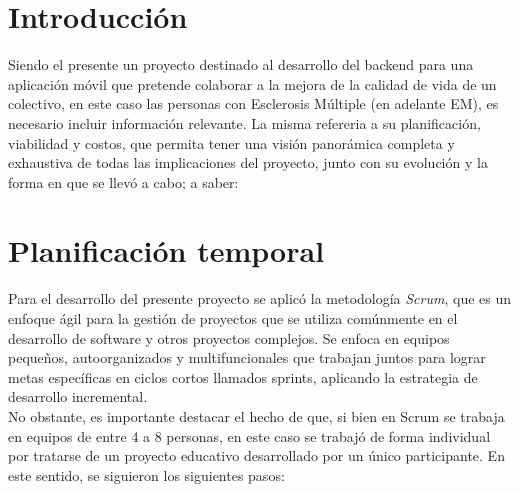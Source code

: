 
\section{Introducción}
Siendo el presente un proyecto destinado al desarrollo del backend para una aplicación móvil que pretende colaborar a la mejora de la calidad de vida de un colectivo, en este caso las personas con Esclerosis Múltiple (en adelante EM), es necesario incluir información relevante. La misma refereria a su planificación, viabilidad y costos, que permita tener una visión panorámica completa y exhaustiva de todas las implicaciones del proyecto, junto con su evolución y la forma en que se llevó a cabo; a saber:

\section{Planificación temporal}
Para el desarrollo del presente proyecto se aplicó la metodología \emph{Scrum}, que es un enfoque ágil para la gestión de proyectos que se utiliza comúnmente en el desarrollo de software y otros proyectos complejos. Se enfoca en equipos pequeños, autoorganizados y multifuncionales que trabajan juntos para lograr metas específicas en ciclos cortos llamados sprints, aplicando la estrategia de desarrollo incremental. \\
No obstante, es importante destacar el hecho de que, si bien en Scrum se trabaja en equipos de entre 4 a 8 personas, en este caso se trabajó de forma individual por tratarse de un proyecto educativo desarrollado por un único participante. En este sentido, se siguieron los siguientes pasos:\\

